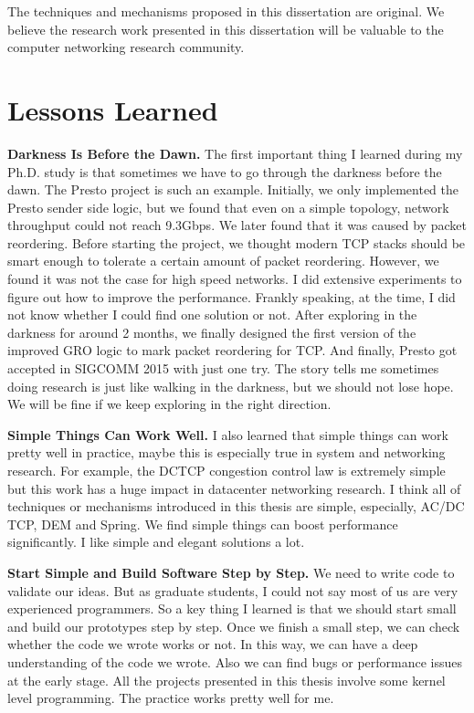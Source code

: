 The techniques and mechanisms proposed in this dissertation are original. 
We believe the research work presented in this dissertation will be valuable to 
the computer networking research community.

\section{Lessons Learned}
{\bf Darkness Is Before the Dawn.}
The first important thing I learned during my Ph.D. study is that sometimes 
we have to go through the darkness before the dawn. The Presto project is such an example. 
Initially, we only implemented the Presto sender side logic, but we found that even on a simple topology, 
network throughput could not reach 9.3Gbps. We later found that it was caused by packet reordering. 
Before starting the project, we thought modern TCP stacks should be smart enough to tolerate 
a certain amount of packet reordering. However, we found it was not the case for high speed networks. 
I did extensive experiments to figure out how to improve the performance. 
Frankly speaking, at the time, I did not know whether I could find one solution or not. 
After exploring in the darkness for around 2 months, we finally designed the first version of the 
improved GRO logic to mark packet reordering for TCP. And finally, Presto got accepted in 
SIGCOMM 2015 with just one try. The story tells me sometimes doing research is just like 
walking in the darkness, but we should not lose hope. We will be fine if we keep exploring in the right direction.

{\bf Simple Things Can Work Well.}
I also learned that simple things can work pretty well in practice, maybe this is 
especially true in system and networking research. For example, the DCTCP congestion control law is extremely 
simple but this work has a huge impact in datacenter networking research. I think 
all of techniques or mechanisms introduced in this thesis are simple, especially, AC/DC TCP, DEM and Spring. 
We find simple things can boost performance significantly. I like simple and elegant solutions a lot. 

{\bf Start Simple and Build Software Step by Step.}
We need to write code to validate our ideas. But as graduate students, I could not say 
most of us are very experienced programmers. So a key thing I learned is that we should start small and 
build our prototypes step by step. Once we finish a small step, we can check whether 
the code we wrote works or not. In this way, we can have a deep understanding of the code we wrote. 
Also we can find bugs or performance issues at the early stage. 
All the projects presented in this thesis involve some kernel level programming. 
The practice works pretty well for me.

